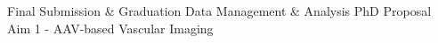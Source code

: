 {\begin{tabularx}{\linewidth}{|l!{\vrule width \myLenLineThicknessThick}*{7}{@{}X@{}|}}
       & 
    
      
      
       & 
    
      
      
       & 
    
      
      
       & 
    
      
      
      
        \\  \hline 
      
    
  
  
  \end{tabularx}
}
\vfill{\centering{} \small{Final Submission \& Graduation}\hspace{ 1.5em } \small{Data Management \& Analysis}\hspace{ 1.5em } \small{PhD Proposal}\hspace{ 1.5em } \small{Aim 1 - AAV-based Vascular Imaging}\hspace{ 1.5em }\par}

